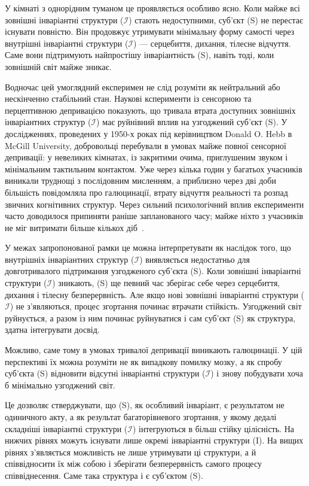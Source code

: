 \documentclass[aps,prd,onecolumn,nofootinbib,superscriptaddress]{revtex4-2} %
\begin{document}
    У кімнаті з однорідним туманом це проявляється особливо ясно. Коли майже всі зовнішні інваріантні структури ($\mathcal{I}$) стають недоступними, суб’єкт (S) не перестає існувати повністю. Він продовжує утримувати мінімальну форму самості через внутрішні інваріантні структури ($\mathcal{I}$) — серцебиття, дихання, тілесне відчуття. Саме вони підтримують найпростішу інваріантність (S), навіть тоді, коли зовнішній світ майже зникає.

    Водночас цей умоглядний експеримен не слід розуміти як нейтральний або нескінченно стабільний стан. Наукові ксперименти із сенсорною та перцептивною депривацією показують, що тривала втрата доступних зовнішніх інваріантних структур ($\mathcal{I}$) має руйнівний вплив на узгоджений суб’єкт (S). У дослідженнях, проведених у 1950-х роках під керівництвом Donald O. Hebb в McGill University, добровольці перебували в умовах майже повної сенсорної депривації: у невеликих кімнатах, із закритими очима, приглушеним звуком і мінімальним тактильним контактом. Уже через кілька годин у багатьох учасників виникали труднощі з послідовним мисленням, а приблизно через дві доби більшість повідомляла про галюцинації, втрату відчуття реальності та розпад звичних когнітивних структур. Через сильний психологічний вплив експерименти часто доводилося припиняти раніше запланованого часу; майже ніхто з учасників не міг витримати більше кількох діб~\cite{Hebb1958}.

    У межах запропонованої рамки це можна інтерпретувати як наслідок того, що внутрішніх інваріантних структур ($\mathcal{I}$) виявляється недостатньо для довготривалого підтримання узгодженого суб’єкта (S). Коли зовнішні інваріантні структури ($\mathcal{I}$) зникають, (S) ще певний час зберігає себе через серцебиття, дихання і тілесну безперервність. Але якщо нові зовнішні інваріантні структури ($\mathcal{I}$) не з’являються, процес згортання починає втрачати стійкість. Узгоджений світ руйнується, а разом із ним починає руйнуватися і сам суб’єкт (S) як структура, здатна інтегрувати досвід.

    Можливо, саме тому в умовах тривалої депривації виникають галюцинації. У цій перспективі їх можна розуміти не як випадкову помилку мозку, а як спробу суб’єкта (S) відновити відсутні інваріантні структури ($\mathcal{I}$) і знову побудувати хоча б мінімально узгоджений світ.

    Це дозволяє стверджувати, що (S), як особливий інваріант, є результатом не одиничного акту, а як результат багаторівневого згортання, у якому дедалі складніші інваріантні структури ($\mathcal{I}$) інтегруються в більш стійку цілісність. На нижчих рівнях можуть існувати лише окремі інваріантні структури (I). На вищих рівнях з’являється можливість не лише утримувати ці структури, а й співвідносити їх між собою і зберігати безперервність самого процесу співвіднесення. Саме така структура і є суб’єктом (S).
\end{document}
